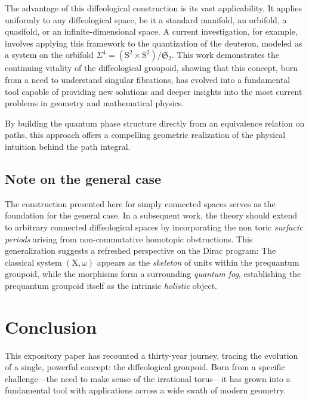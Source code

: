 \documentclass[10pt,reqno,letterpaper,twoside]{amsart}
\theoremstyle{article}
\def \S{\mathrm S}
\def \X{\mathrm X}
\begin{document}
  The advantage of this diffeological construction is its vast applicability.
  It applies uniformly to any diffeological space,
  be it a standard manifold,
  an orbifold,
  a quasifold,
  or an infinite-dimensional space.
  A current investigation,
  for example,
  involves applying this framework to the quantization of the deuteron,
  modeled as a system on the orbifold $\Sigma^4 = (\S^2 \times \S^2)/\mathfrak{S}_2$.
  This work demonstrates the continuing vitality of the diffeological groupoid,
  showing that this concept,
  born from a need to understand singular fibrations,
  has evolved into a fundamental tool capable of providing new solutions and deeper insights into the most current problems in geometry and mathematical physics.
  
  By building the quantum phase structure directly from an equivalence relation on paths,
  this approach offers a compelling geometric realization of the physical intuition behind the path integral.
  
  \subsection {Note on the general case}
  
  The construction presented here for simply connected spaces serves as the foundation for the general case.
  In a subsequent work,
  the theory should extend to arbitrary connected diffeological spaces by incorporating the non toric \emph{surfacic periods} arising from non-commutative homotopic obstructions.
  This generalization suggests a refreshed perspective on the Dirac program: The classical system $(\X, \omega)$ appears as the \emph{skeleton} of units within the prequantum groupoid,
  while the morphisms form a surrounding \emph{quantum fog},
  establishing the prequantum groupoid itself as the intrinsic \emph{holistic} object.
  
  
  \section*{Conclusion}
  
  This expository paper has recounted a thirty-year journey, tracing the evolution of a single, powerful concept: the diffeological groupoid. Born from a specific challenge—the need to make sense of the irrational torus—it has grown into a fundamental tool with applications across a wide swath of modern geometry.
  
\end{document}
